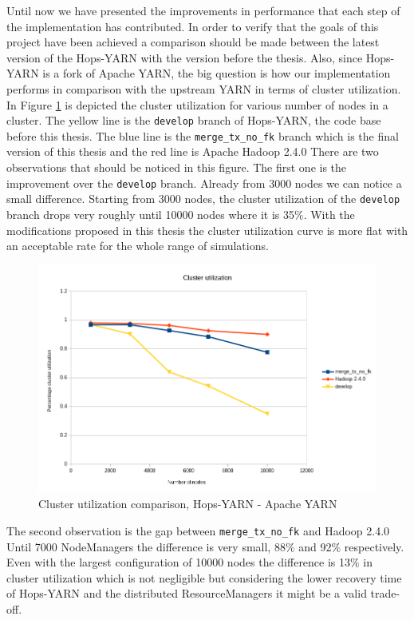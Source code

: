 Until now we have presented the improvements in performance that each
step of the implementation has contributed. In order to verify that
the goals of this project have been achieved a comparison should be
made between the latest version of the Hops-YARN with the version
before the thesis. Also, since Hops-YARN is a fork of Apache YARN, the
big question is how our implementation performs in comparison with the
upstream YARN in terms of cluster utilization. In Figure \ref{fig:ev_cluster_util_final} is depicted
the cluster utilization for various number of nodes in a cluster. 
The yellow line is the \texttt{develop} branch of Hops-YARN, the code
base before this thesis. The blue line is the
\texttt{merge\_tx\_no\_fk} branch which is the final version of this
thesis and the red line is Apache Hadoop 2.4.0 There are two observations
that should be noticed in this figure. The first one is the
improvement over the \texttt{develop} branch. Already from 3000 nodes
we can notice a small difference. Starting from 3000 nodes,
the cluster utilization of the \texttt{develop} branch drops very
roughly until 10000 nodes where it is 35$\%$. With the modifications
proposed in this thesis the cluster utilization curve is more flat
with an acceptable rate for the whole range of simulations.

\begin{figure}
\centering
\includegraphics[scale=0.6]{resources/images/Evaluation/cluster_usage_final.png}
\caption{Cluster utilization comparison, Hops-YARN - Apache YARN}
\label{fig:ev_cluster_util_final}
\end{figure}

The second observation is the gap between \texttt{merge\_tx\_no\_fk} and
Hadoop 2.4.0 Until 7000 NodeManagers the difference is very small,
88$\%$ and 92$\%$ respectively. Even with the largest configuration
of 10000 nodes the difference is 13$\%$ in cluster utilization which
is not negligible but considering the lower recovery time of Hops-YARN
and the distributed ResourceManagers it might be a valid trade-off.


